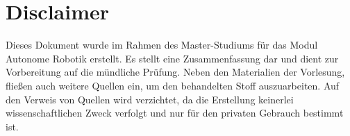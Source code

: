 \documentclass[11pt]{scrartcl}
\begin{document}














\section*{Disclaimer}
Dieses Dokument wurde im Rahmen des Master-Studiums
für das Modul Autonome Robotik erstellt. Es stellt eine 
Zusammenfassung dar und dient zur Vorbereitung auf die
mündliche Prüfung. Neben den Materialien der Vorlesung,
fließen auch weitere Quellen ein, um den behandelten Stoff
auszuarbeiten. Auf den Verweis von Quellen wird verzichtet,
da die Erstellung keinerlei wissenschaftlichen Zweck verfolgt
und nur für den privaten Gebrauch bestimmt ist.
\end{document}
